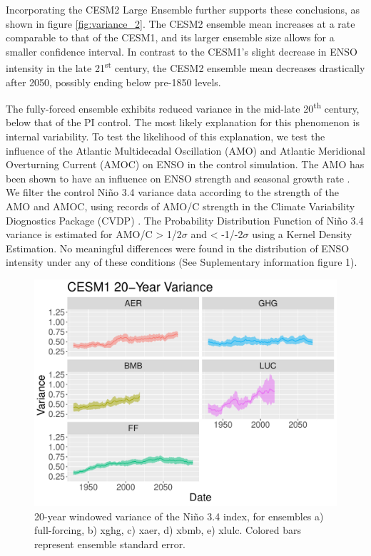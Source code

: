 \documentclass[11pt]{article}
\begin{document}
Incorporating the CESM2 Large Ensemble further supports these conclusions, as shown in figure \ref{fig:variance_2}. The CESM2 ensemble mean increases at a rate comparable to that of the CESM1, and its larger ensemble size allows for a smaller confidence interval. In contrast to the CESM1's slight decrease in ENSO intensity in the late 21\textsuperscript{st} century, the CESM2 ensemble mean decreases drastically after 2050, possibly ending below pre-1850 levels.

The fully-forced ensemble exhibits reduced variance in the mid-late 20\textsuperscript{th} century, below that of the PI control. The most likely explanation for this phenomenon is internal variability. To test the likelihood of this explanation, we test the influence of the Atlantic Multidecadal Oscillation (AMO) and Atlantic Meridional Overturning Current (AMOC) on ENSO in the control simulation. The AMO has been shown to have an influence on ENSO strength and seasonal growth rate \citep{levine2017impact}. We filter the control Niño 3.4 variance data according to the strength of the AMO and AMOC, using records of AMO/C strength in the Climate Variability Diognostics Package (CVDP) \citep{phillips2014evaluating}. The Probability Distribution Function of Niño 3.4 variance is estimated for AMO/C > 1/2\(\sigma\) and < -1/-2\(\sigma\) using a Kernel Density Estimation. No meaningful differences were found in the distribution of ENSO intensity under any of these conditions (See Suplementary information figure 1).

\begin{figure}
\centering
\includegraphics[width=.5\linewidth]{../../data/figures/cesm1.pdf}
\caption{\label{fig:variance_1}20-year windowed variance of the Niño 3.4 index, for ensembles a) full-forcing, b) xghg, c) xaer, d) xbmb, e) xlulc. Colored bars represent ensemble standard error.}
\end{figure}
\end{document}
